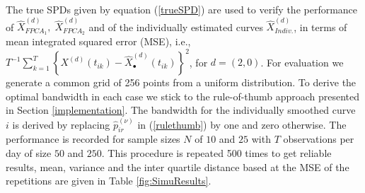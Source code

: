
The true SPDs given by equation (\ref{trueSPD}) are used to verify the performance of $\hat{X}^{(d)}_{FPCA_1},\;  \hat{X}^{(d)}_{FPCA_2}$ and of the individually estimated curves $\hat{X}^{(d)}_{Indiv.}$, in terms of mean integrated squared error (MSE), i.e., $T^{-1} \sum_{k=1}^T \left\{X^{(d)}(t_{ik}) - \hat{X}^{(d)}_\bullet (t_{ik})\right\}^2$, for $d=(2,0)$. For evaluation we generate a common grid of 256 points from a uniform distribution.
To derive the optimal bandwidth in each case we stick to the rule-of-thumb approach presented in Section \ref{implementation}. %
The bandwidth for the individually smoothed curve $i$ is derived by replacing $\hat{p}^{(\nu)}_{ir}$ in (\ref{rulethumb}) by one and zero otherwise.
The performance is recorded for sample sizes $N$ of $10$ and $25$ with $T$ observations per day of size $50$ and $250$.  This procedure is repeated 500 times to get reliable results, mean, variance and the inter quartile distance based at the MSE of the repetitions are given in Table \ref{fig:SimuResults}. %



